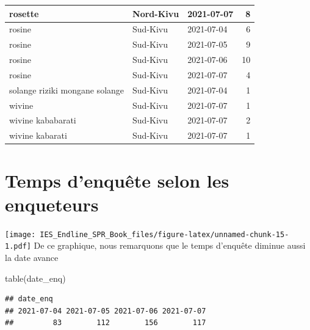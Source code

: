 \documentclass[
]{book}
\newenvironment{Shaded}{\begin{snugshade}}{\end{snugshade}}
\newcommand{\AttributeTok}[1]{\textcolor[rgb]{0.77,0.63,0.00}{#1}}
\newcommand{\ConstantTok}[1]{\textcolor[rgb]{0.00,0.00,0.00}{#1}}
\newcommand{\FunctionTok}[1]{\textcolor[rgb]{0.00,0.00,0.00}{#1}}
\newcommand{\NormalTok}[1]{#1}
\newcommand{\OtherTok}[1]{\textcolor[rgb]{0.56,0.35,0.01}{#1}}
\newcommand{\SpecialCharTok}[1]{\textcolor[rgb]{0.00,0.00,0.00}{#1}}
\newcommand{\StringTok}[1]{\textcolor[rgb]{0.31,0.60,0.02}{#1}}
\begin{document}
\begin{table}
\begin{tabular}[t]{l|l|l|r}
\hline
rosette & Nord-Kivu & 2021-07-07 & 8\\
\hline
rosine & Sud-Kivu & 2021-07-04 & 6\\
\hline
rosine & Sud-Kivu & 2021-07-05 & 9\\
\hline
rosine & Sud-Kivu & 2021-07-06 & 10\\
\hline
rosine & Sud-Kivu & 2021-07-07 & 4\\
\hline
solange riziki mongane solange & Sud-Kivu & 2021-07-04 & 1\\
\hline
wivine & Sud-Kivu & 2021-07-07 & 1\\
\hline
wivine kababarati & Sud-Kivu & 2021-07-07 & 2\\
\hline
wivine kabarati & Sud-Kivu & 2021-07-07 & 1\\
\hline
\end{tabular}
\end{table}

\hypertarget{temps-denquuxeate-selon-les-enqueteurs}{%
\section{Temps d'enquête selon les enqueteurs}\label{temps-denquuxeate-selon-les-enqueteurs}}

\texttt{[image: IES\_Endline\_SPR\_Book\_files/figure-latex/unnamed-chunk-15-1.pdf]}
De ce graphique, nous remarquons que le temps d'enquête diminue aussi la date avance

\begin{Shaded}
\begin{Highlighting}[]
\FunctionTok{table}\NormalTok{(date\_enq)}
\end{Highlighting}
\end{Shaded}

\begin{verbatim}
## date_enq
## 2021-07-04 2021-07-05 2021-07-06 2021-07-07 
##         83        112        156        117
\end{verbatim}

\begin{Shaded}
\end{Shaded}
\end{document}
